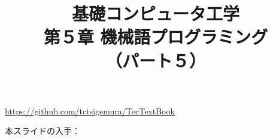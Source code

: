 \documentclass{beamer}                 %
\begin{document}
\title{基礎コンピュータ工学\\第５章 機械語プログラミング\\（パート５）}
\date{}

\begin{frame}
  \titlepage
  \centerline{\url{https://github.com/tctsigemura/TecTextBook}}
  \vfill
  \centerline{本スライドの入手：
    }
\end{frame}

\end{document}
